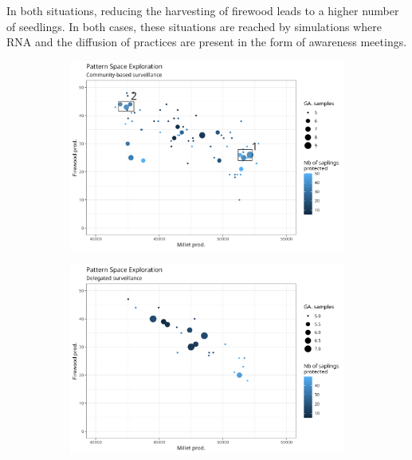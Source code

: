 \documentclass{article}
\begin{document}
    In both situations, reducing the harvesting of firewood leads to a higher number of seedlings. In both cases, these situations are reached by simulations where RNA and the diffusion of practices are present in the form of awareness meetings.

    \begin{figure}
        \centering
        \begin{subfigure}[b]{0.85\textwidth}
           \includegraphics[width=1\linewidth]{./img/om_pse_sPop.png}
           \caption{}
           \label{fig:pseSPOP} 
        \end{subfigure}
        
        \begin{subfigure}[b]{0.85\textwidth}
           \includegraphics[width=1\linewidth]{./img/om_pse_sReprez.png}
           \caption{}
           \label{fig:pseSDELEG}
        \end{subfigure}
        

\end{figure}
\end{document}
